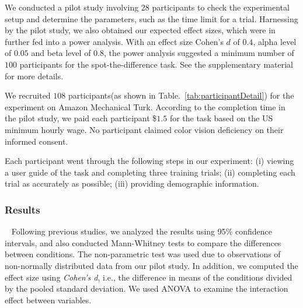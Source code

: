\vspace{.3em}
We conducted a pilot study involving 28 participants to check the experimental setup and determine the parameters, such as the time limit for a trial.
Harnessing by the pilot study, we also obtained our expected effect sizes, which were in further fed into a power analysis. With an effect size Cohen's $d$ of $0.4$, alpha level of $0.05$ and beta level of $0.8$, the power analysis suggested a minimum number of $100$ participants for the spot-the-difference task. See the supplementary material for more details.

\vspace{.3em}
We recruited $108$ participants(as shown in Table.~\ref{tab:participantDetail}) for the experiment on Amazon Mechanical Turk.
According to the completion time in the pilot study, we paid each participant \$$1.5$ for the task based on the US minimum hourly wage.
No participant claimed color vision deficiency on their informed consent.

\vspace{.3em}
Each participant went through the following steps in our experiment: (i) viewing a user guide of the task and completing three training trials; (ii) completing each trial as accurately as possible; (iii) providing demographic information.

\subsubsection{Results}
\
\newline
Following previous studies, we analyzed the results using 95\% confidence intervals, and also conducted Mann-Whitney tests to compare the differences between conditions. The non-parametric test was used due to observations of non-normally distributed data from our pilot study. In addition, we computed the effect size using \emph{Cohen's d}, i.e., the difference in means of the conditions divided by the pooled standard deviation. We used ANOVA to examine the interaction effect between variables.


